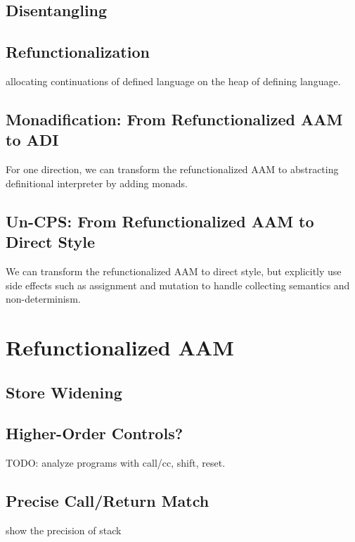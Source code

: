 \documentclass[acmsmall,review,anonymous]{acmart}\settopmatter{printfolios=true,printccs=false,printacmref=false}
\begin{document}
\subsection{Disentangling}

\subsection{Refunctionalization}

allocating continuations of defined language on the heap of defining language.


\subsection{Monadification: From Refunctionalized AAM to ADI}

For one direction, we can transform the refunctionalized AAM to abstracting definitional interpreter
by adding monads.

\subsection{Un-CPS: From Refunctionalized AAM to Direct Style}

We can transform the refunctionalized AAM to direct style, but explicitly use 
side effects such as assignment and mutation to handle collecting semantics and non-determinism.

\section{Refunctionalized AAM}

\subsection{Store Widening}

\subsection{Higher-Order Controls?}

TODO: analyze programs with call/cc, shift, reset.

\subsection{Precise Call/Return Match}

show the precision of stack
\end{document}
